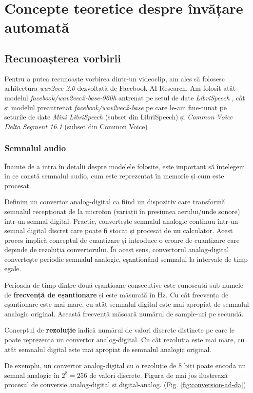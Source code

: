 \chapter{Concepte teoretice despre învățare automată}

\section{Recunoașterea vorbirii}
Pentru a putea recunoaște vorbirea dintr-un videoclip, am ales să folosesc arhitectura
\textit{wav2vec 2.0} \cite{wav2vec2} dezvoltată de Facebook AI Research. Am folosit 
atât modelul \textit{facebook/wav2vec2-base-960h} antrenat pe setul de date 
\textit{LibriSpeech} \cite{librispeech}, cât și modelul preantrenat
\textit{facebook/wav2vec2-base} pe care le-am fine-tunat pe seturile
de date \textit{Mini LibriSpeech} (subset din LibriSpeech) și
\textit{Common Voice Delta Segment 16.1} (subset din Common Voice) \cite{commonvoice}.
\par

\subsection{Semnalul audio}
Înainte de a intra în detalii despre modelele folosite, este important să înțelegem în 
ce constă semnalul audio, cum este reprezentat în memorie și cum este procesat.

\par
Definim un convertor analog-digital ca fiind un dispozitiv care transformă semnalul recepționat 
de la microfon (variații în presiunea aerului/unde sonore) într-un semnal digital.
Practic, convertește semnalul analogic continuu într-un
semnal digital discret care poate fi stocat și procesat de un calculator. Acest proces implică
conceptul de cuantizare și introduce o eroare de cuantizare care depinde de rezoluția convertorului.
În acest sens, convertorul analog-digital convertește periodic semnalul analogic, eșantionând semnalul
la intervale de timp egale.
\par
Perioada de timp dintre două eșantioane consecutive este cunoscută sub numele de \textbf{frecvență de eșantionare}
și este măsurată în Hz. Cu cât frecvența de eșantionare este mai mare, cu atât semnalul digital este mai apropiat
de semnalul analogic original. Această frecvență măsoară numărul de sample-uri pe secundă.
\par
Conceptul de \textbf{rezoluție} indică numărul de valori discrete distincte pe care le poate 
reprezenta un convertor analog-digital. Cu cât rezoluția este mai mare, cu atât semnalul digital
este mai apropiat de semnalul analogic original.
\par
De exemplu, un convertor analog-digital cu o rezoluție de 8 biți poate encoda un semnal analogic
în $2^8 = 256$ de valori discrete. Figura de mai jos ilustrează procesul de conversie analog-digital
și digital-analog. (Fig. \ref{fig:conversion-ad-da})

